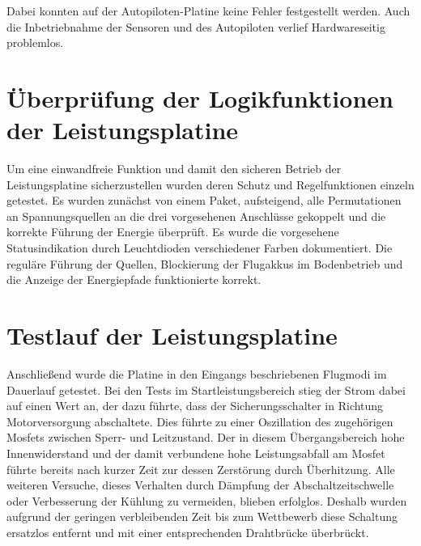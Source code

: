Dabei konnten auf der Autopiloten-Platine keine Fehler festgestellt werden.
Auch die Inbetriebnahme der Sensoren und des Autopiloten verlief Hardwareseitig problemlos.

\section{Überprüfung der Logikfunktionen der Leistungsplatine}

Um eine einwandfreie Funktion und damit den sicheren Betrieb der Leistungsplatine sicherzustellen wurden deren Schutz und Regelfunktionen einzeln getestet.
Es wurden zunächst von einem Paket, aufsteigend, alle Permutationen an Spannungsquellen an die drei vorgesehenen Anschlüsse gekoppelt und die korrekte Führung der Energie überprüft.
Es wurde die vorgesehene Statusindikation durch Leuchtdioden verschiedener Farben dokumentiert.
Die reguläre Führung der Quellen, Blockierung der Flugakkus im Bodenbetrieb und die Anzeige der Energiepfade funktionierte korrekt.

\section{Testlauf der Leistungsplatine}

Anschließend wurde die Platine in den Eingangs beschriebenen Flugmodi im Dauerlauf getestet.
Bei den Tests im Startleistungsbereich stieg der Strom dabei auf einen Wert an, der dazu führte, dass der Sicherungsschalter in Richtung Motorversorgung abschaltete.
Dies führte zu einer Oszillation des zugehörigen Mosfets zwischen Sperr- und Leitzustand. Der in diesem Übergangsbereich hohe Innenwiderstand und der damit verbundene hohe Leistungsabfall am Mosfet führte bereits nach kurzer Zeit zur dessen Zerstörung durch Überhitzung.
Alle weiteren Versuche, dieses Verhalten durch Dämpfung der Abschaltzeitschwelle oder Verbesserung der Kühlung zu vermeiden, blieben erfolglos. Deshalb wurden aufgrund der geringen verbleibenden Zeit bis zum Wettbewerb diese Schaltung ersatzlos entfernt und mit einer entsprechenden Drahtbrücke überbrückt.